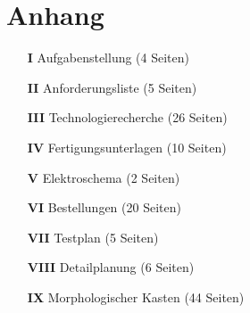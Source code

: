 

\newpage
\section*{Anhang}
\begin{itemize}
  \item[\textbf{I}] Aufgabenstellung (4 Seiten)
  \item[\textbf{II}] Anforderungsliste (5 Seiten)
  \item[\textbf{III}] Technologierecherche (26 Seiten)
  \item[\textbf{IV}] Fertigungsunterlagen (10 Seiten)
  \item[\textbf{V}] Elektroschema (2 Seiten)
  \item[\textbf{VI}] Bestellungen (20 Seiten)
  \item[\textbf{VII}] Testplan (5 Seiten)
 \item[\textbf{VIII}]  Detailplanung (6 Seiten)
  \item[\textbf{IX}] Morphologischer Kasten (44 Seiten)
\end{itemize}
 
%
%
%
%



